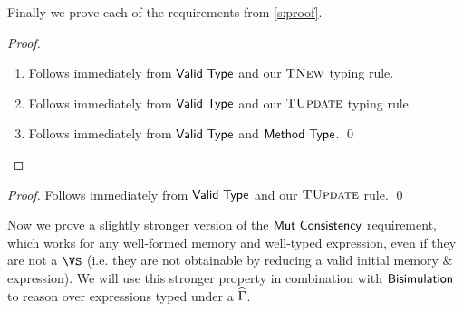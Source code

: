 Finally we prove each of the requirements from \autoref{s:proof}.

\setcounter{requirement}{0}
\SS\REQTypeCons
\SS\begin{proof}
	\SS\begin{enumerate}
		\item Follows immediately from $\textsf{Valid Type}$ and our $\textsc{TNew}$
		typing rule.
		\item Follows immediately from $\textsf{Valid Type}$ and our $\textsc{TUpdate}$
		typing rule.
		\item Follows immediately from $\textsf{Valid Type}$ and $\textsf{Method Type}$.
	\qed\end{enumerate}
\end{proof}

\setcounter{requirement}{4}
\SS\REQMutUpd
\SS\begin{proof}
	Follows immediately from $\textsf{Valid Type}$ and our $\textsc{TUpdate}$
	rule.
\qed\end{proof}

Now we prove a slightly stronger version of the $\textsf{Mut Consistency}$
requirement, which works for any well-formed memory and well-typed
expression, even if they are not a $\VS$ (i.e. they are not obtainable
by reducing a valid initial memory \& expression). We will use this
stronger property in combination with $\textsf{Bisimulation}$ to reason
over expressions typed under a $\widehat{\Gamma}$.

